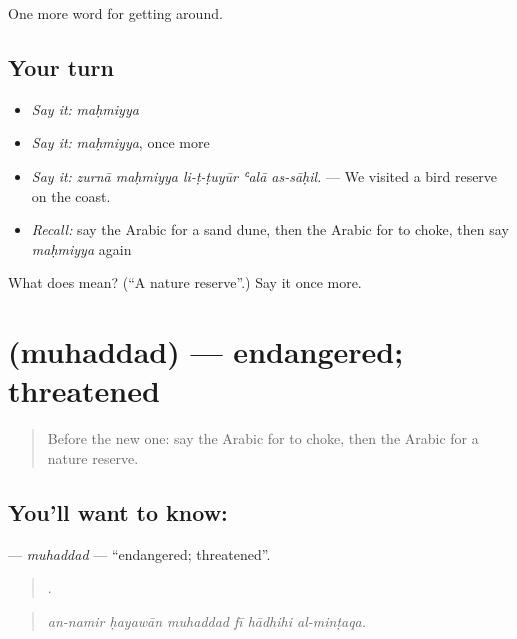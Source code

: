 \begin{grammarlens}[title={What you've built}]
One more word for getting around.
\end{grammarlens}

\subsection*{Your turn}
\begin{itemize}
\raggedright
  \item \emph{Say it:} \emph{maḥmiyya}
  \item \emph{Say it:} \emph{maḥmiyya}, once more
  \item \emph{Say it:} \emph{zurnā maḥmiyya li-ṭ-ṭuyūr ʿalā as-sāḥil.} — We visited a bird reserve on the coast.
  \item \emph{Recall:} say the Arabic for a sand dune, then the Arabic for to choke, then say \emph{maḥmiyya} again
\end{itemize}

\begin{tcolorbox}[breakable,colback=teal!4,colframe=teal!35!black,title={Before you move on}]
What does  mean? (\textquotedblleft{}A nature reserve\textquotedblright{}.) Say it once more.
\end{tcolorbox}
\section[\texorpdfstring{\ar{مهدد} (muhaddad)}{مهدد (muhaddad)}]{ (muhaddad) — endangered; threatened}

\label{lesson:AR-C467-muhaddad}



\begin{quote}
Before the new one: say the Arabic for to choke, then the Arabic for a nature reserve.
\end{quote}

\subsection*{You'll want to know: }
\textbf{} — \emph{muhaddad} — \textquotedblleft{}endangered; threatened\textquotedblright{}.

\begin{quote}
     .
\end{quote}

\begin{quote}
\emph{an-namir ḥayawān muhaddad fī hādhihi al-minṭaqa.}
\end{quote}

